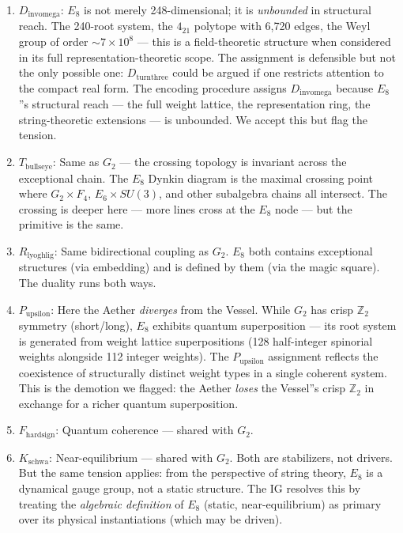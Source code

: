 \documentclass[12pt,a4paper]{article}
\begin{document}
\begin{enumerate}
    \item \textbf{$D_{\text{invomega}}$}: $E_8$ is not merely 248-dimensional; it is \emph{unbounded} in structural reach. The 240-root system, the $4_{21}$ polytope with 6,720 edges, the Weyl group of order $\sim 7 \times 10^8$ --- this is a field-theoretic structure when considered in its full representation-theoretic scope. The assignment is defensible but not the only possible one: $D_{\text{turnthree}}$ could be argued if one restricts attention to the compact real form. The encoding procedure assigns $D_{\text{invomega}}$ because $E_8$''s structural reach --- the full weight lattice, the representation ring, the string-theoretic extensions --- is unbounded. We accept this but flag the tension.
    \item \textbf{$T_{\text{bullseye}}$}: Same as $G_2$ --- the crossing topology is invariant across the exceptional chain. The $E_8$ Dynkin diagram is the maximal crossing point where $G_2 \times F_4$, $E_6 \times SU(3)$, and other subalgebra chains all intersect. The crossing is deeper here --- more lines cross at the $E_8$ node --- but the primitive is the same.
    \item \textbf{$R_{\text{lyoghlig}}$}: Same bidirectional coupling as $G_2$. $E_8$ both contains exceptional structures (via embedding) and is defined by them (via the magic square). The duality runs both ways.
    \item \textbf{$P_{\text{upsilon}}$}: Here the Aether \emph{diverges} from the Vessel. While $G_2$ has crisp $\mathbb{Z}_2$ symmetry (short/long), $E_8$ exhibits quantum superposition --- its root system is generated from weight lattice superpositions (128 half-integer spinorial weights alongside 112 integer weights). The $P_{\text{upsilon}}$ assignment reflects the coexistence of structurally distinct weight types in a single coherent system. This is the demotion we flagged: the Aether \emph{loses} the Vessel''s crisp $\mathbb{Z}_2$ in exchange for a richer quantum superposition.
    \item \textbf{$F_{\text{hardsign}}$}: Quantum coherence --- shared with $G_2$.
    \item \textbf{$K_{\text{schwa}}$}: Near-equilibrium --- shared with $G_2$. Both are stabilizers, not drivers. But the same tension applies: from the perspective of string theory, $E_8$ is a dynamical gauge group, not a static structure. The IG resolves this by treating the \emph{algebraic definition} of $E_8$ (static, near-equilibrium) as primary over its physical instantiations (which may be driven).

\end{enumerate}
\end{document}
